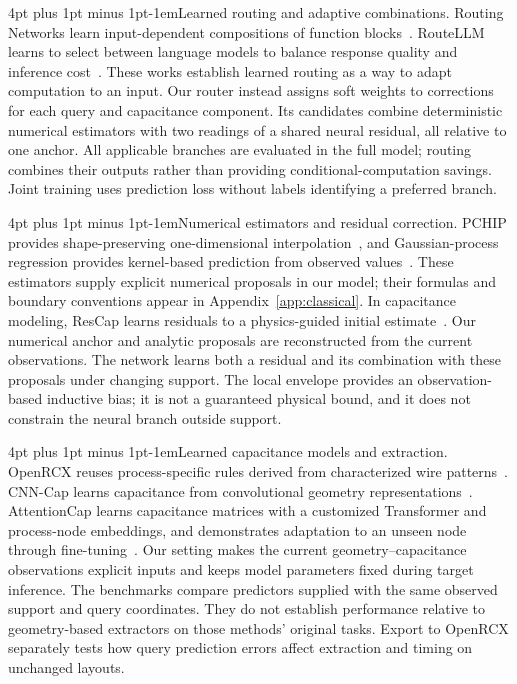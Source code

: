 \documentclass{article}
\makeatletter
\renewcommand{\paragraph}{\@startsection{paragraph}{4}{\z@}
  {4pt plus 1pt minus 1pt}{-1em}{\normalsize\bf}}
\makeatother
\begin{document}
\paragraph{Learned routing and adaptive combinations.}
Routing Networks learn input-dependent compositions of function
blocks~\citep{rosenbaum2018routing}. RouteLLM learns to select between language
models to balance response quality and inference cost~\citep{ong2025routellm}.
These works establish learned routing as a way to adapt computation to an input.
Our router instead assigns soft weights to corrections for each query and
capacitance component. Its candidates combine deterministic numerical estimators
with two readings of a shared neural residual, all relative to one anchor.
All applicable branches are evaluated in the full model; routing combines their
outputs rather than providing conditional-computation savings. Joint training
uses prediction loss without labels identifying a preferred branch.

\paragraph{Numerical estimators and residual correction.}
PCHIP provides shape-preserving one-dimensional interpolation~\citep{pchip},
and Gaussian-process regression provides kernel-based prediction from observed
values~\citep{gpml}. These estimators supply explicit numerical proposals in our
model; their formulas and boundary conventions appear in
Appendix~\ref{app:classical}. In capacitance modeling, ResCap learns residuals
to a physics-guided initial estimate~\citep{tsai2025rescap}.
Our numerical anchor and analytic proposals are reconstructed from the current
observations. The network learns both a residual and its combination with these
proposals under changing support. The local envelope provides an
observation-based inductive bias; it is not a guaranteed physical bound, and it
does not constrain the neural branch outside support.

\paragraph{Learned capacitance models and extraction.}
OpenRCX reuses process-specific rules derived from characterized wire
patterns~\citep{openrcx}. CNN-Cap learns capacitance from convolutional geometry
representations~\citep{cnncap}. AttentionCap learns capacitance matrices with a
customized Transformer and process-node embeddings, and demonstrates adaptation
to an unseen node through fine-tuning~\citep{attentioncap}.
Our setting makes the current geometry--capacitance observations explicit inputs
and keeps model parameters fixed during target inference. The benchmarks compare
predictors supplied with the same observed support and query coordinates.
They do not establish performance relative to geometry-based extractors on
those methods' original tasks. Export to OpenRCX separately tests how query
prediction errors affect extraction and timing on unchanged layouts.
\end{document}
